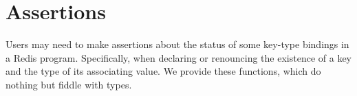 \newcommand{\framedhslinecorrect}[2]%
  {#1[#2]}

\newcommand{\framedhs}{\sethscode{framedhscode}}


\newenvironment{inlinehscode}%
  {\(\def\column##1##2{}%
   \let\>\undefined\let\<\undefined\let\\\undefined
   \newcommand\>[1][]{}\newcommand\<[1][]{}\newcommand\\[1][]{}%
   \def\fromto##1##2##3{##3}%
   \def\nextline{}}{\) }%

\newcommand{\inlinehs}{\sethscode{inlinehscode}}


\newenvironment{joincode}%
  {\let\orighscode=\hscode
   \let\origendhscode=\endhscode
   \def\endhscode{\def\hscode{\endgroup\def\@currenvir{hscode}\\}\begingroup}
   \orighscode\def\hscode{\endgroup\def\@currenvir{hscode}}}%
  {\origendhscode
   \global\let\hscode=\orighscode
   \global\let\endhscode=\origendhscode}%

\makeatother
\EndFmtInput
%

%
\makeatletter

\let\Varid\mathit
\let\Conid\mathsf

\def\commentbegin{\quad\{\ }
\def\commentend{\}}

\newcommand{\ty}[1]{\Conid{#1}}
\newcommand{\con}[1]{\Conid{#1}}
\newcommand{\id}[1]{\Varid{#1}}
\newcommand{\cl}[1]{\Varid{#1}}
\newcommand{\opsym}[1]{\mathrel{#1}}

\newcommand\Keyword[1]{\textbf{\textsf{#1}}}
\newcommand\Hide{\mathbin{\downarrow}}
\newcommand\Reveal{\mathbin{\uparrow}}




\makeatother
\EndFmtInput

\section{Assertions}
\label{sec:assertions}

Users may need to make assertions about the status of some key-type bindings in
 a Redis program. Specifically, when declaring or renouncing the existence of
 a key and the type of its associating value. We provide these functions,
 which do nothing but fiddle with types.

